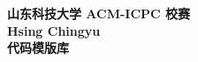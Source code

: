 \documentclass[9pt,landscape]{article}
\begin{document}
\thispagestyle{empty}
\null\vfill
\begin{center}
  \Huge \textbf{山东科技大学 ACM-ICPC 校赛 \\Hsing Chingyu \\代码模版库}

\vspace{1.5cm}

\end{center}
\vfill
\clearpage

\begin{multicols}{2}
\tableofcontents
\end{multicols}

\newpage

\columnseprule=0.25pt

\begin{multicols}{2}

\end{multicols}
\end{document}
